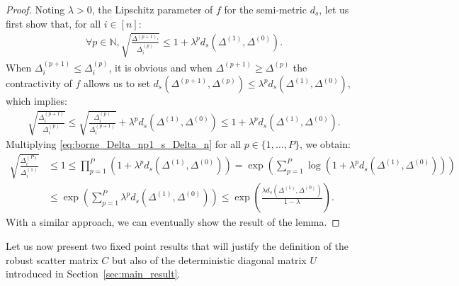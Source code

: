 \documentclass[a4papaer, titlepage]{book}
\begin{document}
\begin{proof}
  Noting $\lambda >0$, the Lipschitz parameter of $f$ for the semi-metric $d_s$, let us first show that, for all $i\in [n]$:
  \begin{align}\label{eq:borne_Delta_np1_s_Delta_n}
     \forall p\in \mathbb N, \sqrt{\frac{\Delta^{(p+1)_i}}{\Delta^{(p)}_i}} \leq  1 + \lambda^p d_s \left( \Delta^{(1)}, \Delta^{(0)} \right).
  \end{align} 
  When $\Delta^{(p+1)}_i \leq \Delta^{(p)}_i$, it is obvious and when $\Delta^{(p+1)} \geq \Delta^{(p)}$ the contractivity of $f$ allows us to set $d_s(\Delta^{(p+1)}, \Delta^{(p)}) \leq \lambda^p d_s \left( \Delta^{(1)}, \Delta^{(0)} \right)$, which implies:
  \begin{align*}
    \sqrt{\frac{\Delta^{(p+1)}_i}{\Delta^{(p)}_i}} \leq \sqrt{\frac{\Delta^{(p)}_i}{\Delta^{(p+1)}_i}} + \lambda^p d_s \left( \Delta^{(1)}, \Delta^{(0)} \right) \leq 1 + \lambda^p d_s \left( \Delta^{(1)}, \Delta^{(0)} \right).
  \end{align*}
  Multiplying \eqref{eq:borne_Delta_np1_s_Delta_n} for all $p \in \{1,\ldots, P\}$, we obtain:
  \begin{align*}
    \sqrt{\frac{\Delta^{(P)}_i}{\Delta_i^{(1)}}} 
    &\leq 1 \leq \prod_{p=1}^P \left( 1 + \lambda^p d_s \left( \Delta^{(1)}, \Delta^{(0)} \right) \right) 
    = \exp \left( \sum_{p=1}^P \log \left( 1+ \lambda^p d_s \left( \Delta^{(1)}, \Delta^{(0)} \right) \right)\right)\\
    &\leq \exp \left( \sum_{p=1}^P  \lambda^p d_s \left( \Delta^{(1)}, \Delta^{(0)} \right)\right) \leq \exp \left( \frac{\lambda d_s \left( \Delta^{(1)}, \Delta^{(0)} \right)}{1- \lambda} \right).
  \end{align*}
  With a similar approach, we can eventually show the result of the lemma.  
\end{proof}


Let us now present two fixed point results that will justify the definition of the robust scatter matrix $C$ but also of the deterministic diagonal matrix $U$ introduced in Section~\ref{sec:main_result}. 
\end{document}
